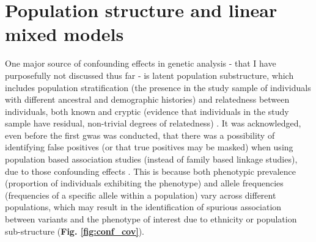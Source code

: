 \newpage


\section{Population structure and linear mixed models}
\label{sec:linear_mixed_models}

One major source of confounding effects in genetic analysis - that I have purposefully not discussed thus far -  is latent population substructure, which includes population stratification (the presence in the study sample of individuals with different ancestral and demographic histories) and relatedness between individuals, both known and cryptic (evidence that individuals in the study sample have residual, non-trivial degrees of relatedness) \cite{mccarthy2008genome}.
It was acknowledged, even before the first \gls{gwas} was conducted, that there was a possibility of identifying false positives (or that true positives may be masked) when using population based association studies (instead of family based linkage studies), due to those confounding effects \cite{burton2005key}. 
This is because both phenotypic prevalence (proportion of individuals exhibiting the phenotype) and allele frequencies (frequencies of a specific allele within a population) vary across different populations, which may result in the identification of spurious association between variants and the phenotype of interest due to ethnicity or population sub-structure \cite{burton2005key} (\textbf{Fig. \ref{fig:conf_cov}}).


